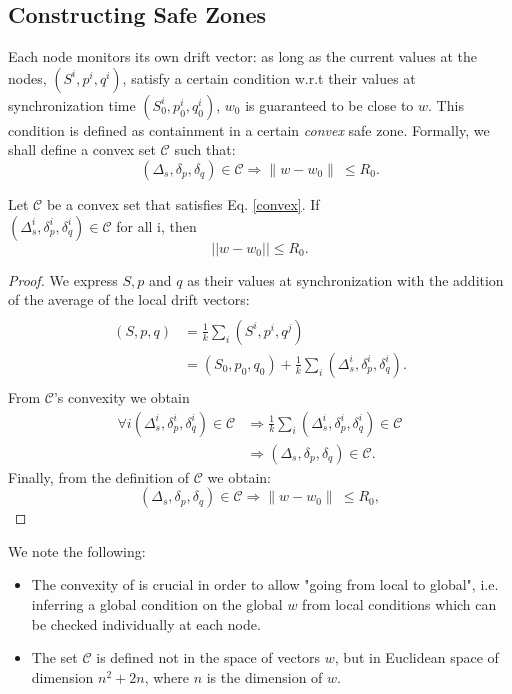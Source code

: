 \subsection{Constructing Safe Zones}
Each node monitors its own drift vector: as long as the current values
at the nodes, $(S^i,p^i,q^i)$, satisfy a certain condition w.r.t their
values 
at synchronization time $(S^i_0,p^i_0,q^i_0)$, $w_0$ is guaranteed to be close to $w$.
This condition is defined as containment in a certain \textit{convex} safe zone. 
Formally, we shall define a convex set $\mathcal{C}$ such that:
\begin{equation} \label{convex}
(\Delta_s, \delta_p, \delta_q) \in \mathcal{C} \Rightarrow \parallel w-w_0
\parallel \ \leq R_0.
\end{equation}
\begin{lemma} \label{averages}
Let $\mathcal{C}$ be a convex set that satisfies Eq. \ref{convex}.
If \\
$(\Delta_s^i, \delta_p^i, \delta_q^i) \in \mathcal{C}$ for all i, then
\begin{equation*}
||w-w_0|| \leq R_0.
\end{equation*}
\end{lemma}
\begin{proof}
We express $S, p$ and $q$ as their values at synchronization with the addition of the average of the local drift vectors:
\begin{equation}
\begin{split}
\\(S,p,q) & = \frac{1}{k} \sum_i (S^i,p^i,q^j) \\
 & = (S_0,p_0,q_0) + \frac{1}{k} \sum_i (\Delta_s^i,\delta^i_p,\delta_q^i). \\
\end{split}
\end{equation}
From $\mathcal{C}$'s convexity  we obtain
\begin{equation}
\begin{split}
\forall i (\Delta_s^i,\delta^i_p,\delta_q^i) \in \mathcal{C} & \Rightarrow
\frac{1}{k} \sum_i (\Delta_s^i,\delta^i_p,\delta_q^i) \in \mathcal{C} \\
& \Rightarrow (\Delta_s,\delta_p,\delta_q) \in \mathcal{C}.
\end{split}
\end{equation}
Finally, from the definition of $\mathcal{C}$ we obtain:
\begin{equation}
(\Delta_s,\delta_p,\delta_q) \in \mathcal{C} \Rightarrow \parallel w-w_0
\parallel \ \leq R_0,
\end{equation}
\end{proof}
We note the following:
\begin{itemize}
    \item The convexity of  is crucial in order to allow "going from
    local to global", i.e. inferring a global condition on the global $w$ from
    local conditions which can be checked individually at each node.
\item The set $\mathcal{C}$ is defined not in the space of vectors $w$, but in
Euclidean space of dimension $n^2+2n$, where $n$ is the dimension of $w$.
\end{itemize}

